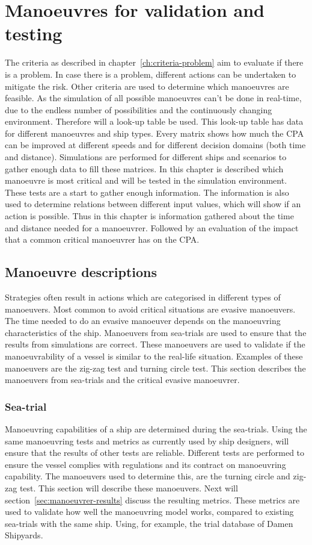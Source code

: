 \chapter{Manoeuvres for validation and testing}
\label{ch:criteria-manouvre}
The criteria as described in chapter~\ref{ch:criteria-problem} aim to evaluate if there is a problem. In case there is a problem, different actions can be undertaken to mitigate the risk. Other criteria are used to determine which manoeuvres are feasible. As the simulation of all possible manoeuvres can't be done in real-time, due to the endless number of possibilities and the continuously changing environment. Therefore will a look-up table be used. This look-up table has data for different manoeuvres and ship types. Every matrix shows how much the CPA can be improved at different speeds and for different decision domains (both time and distance).
Simulations are performed for different ships and scenarios to gather enough data to fill these matrices. In this chapter is described which manoeuvre is most critical and will be tested in the simulation environment. These tests are a start to gather enough information. The information is also used to determine relations between different input values, which will show if an action is possible. Thus in this chapter is information gathered about the time and distance needed for a manoeuvrer. Followed by an evaluation of the impact that a common critical manoeuvrer has on the CPA.

\section{Manoeuvre descriptions}
\label{sec:manoeuvrer-description}
Strategies often result in actions which are categorised in different types of manoeuvers. Most common to avoid critical situations are evasive manoeuvers. The time needed to do an evasive manoeuver depends on the manoeuvring characteristics of the ship. Manoeuvers from sea-trials are used to ensure that the results from simulations are correct. These manoeuvers are used to validate if the manoeuvrability of a vessel is similar to the real-life situation. Examples of these manoeuvers are the zig-zag test and turning circle test. This section describes the manoeuvers from sea-trials and the critical evasive manoeuvrer.

\subsection{Sea-trial}
Manoeuvring capabilities of a ship are determined during the sea-trials. Using the same manoeuvring tests and metrics as currently used by ship designers, will ensure that the results of other tests are reliable. Different tests are performed to ensure the vessel complies with regulations and its contract on manoeuvring capability. The manoeuvers used to determine this, are the turning circle and zig-zag test. This section will describe these manoeuvers. Next will section~\ref{sec:manoeuvrer-results} discuss the resulting metrics. These metrics are used to validate how well the manoeuvring model works, compared to existing sea-trials with the same ship. Using, for example, the trial database of Damen Shipyards.

